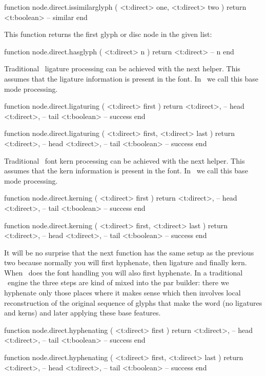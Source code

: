 \starttyping[option=LUA]
function node.direct.issimilarglyph ( <t:direct>  one, <t:direct> two )
    return <t:boolean> -- similar
end
\stoptyping

This function returns the first glyph or disc node in the given list:

\starttyping[option=LUA]
function node.direct.hasglyph ( <t:direct> n )
    return <t:direct> -- n
end
\stoptyping

Traditional \TEX\ ligature processing can be achieved with the next helper. This
assumes that the ligature information is present in the font. In \CONTEXT\ we
call this base mode processing.

\starttyping[option=LUA]
function node.direct.ligaturing ( <t:direct> first )
    return
        <t:direct>, -- head
        <t:direct>, -- tail
        <t:boolean> -- success
end

function node.direct.ligaturing ( <t:direct> first, <t:direct> last )
    return
        <t:direct>, -- head
        <t:direct>, -- tail
        <t:boolean> -- success
end
\stoptyping

Traditional \TEX\ font kern processing can be achieved with the next helper. This
assumes that the kern information is present in the font. In \CONTEXT\ we
call this base mode processing.

\starttyping[option=LUA]
function node.direct.kerning ( <t:direct> first )
    return
        <t:direct>, -- head
        <t:direct>, -- tail
        <t:boolean> -- success
end

function node.direct.kerning ( <t:direct> first, <t:direct> last )
    return
        <t:direct>, -- head
        <t:direct>, -- tail
        <t:boolean> -- success
end
\stoptyping

It will be no surprise that the next function has the same setup as the previous
two because normally you will first hyphenate, then ligature and finally kern.
When \LUA\ does the font handling you will also first hyphenate. In a traditional
\TEX\ engine the three steps are kind of mixed into the par builder: there we
hyphenate only those places where it makes sense which then involves local
reconstruction of the original sequence of glyphs that make the word (no
ligatures and kerns) and later applying these base features.

\starttyping[option=LUA]
function node.direct.hyphenating ( <t:direct> first )
    return
        <t:direct>, -- head
        <t:direct>, -- tail
        <t:boolean> -- success
end

function node.direct.hyphenating ( <t:direct> first, <t:direct> last )
    return
        <t:direct>, -- head
        <t:direct>, -- tail
        <t:boolean> -- success
end
\stoptyping

